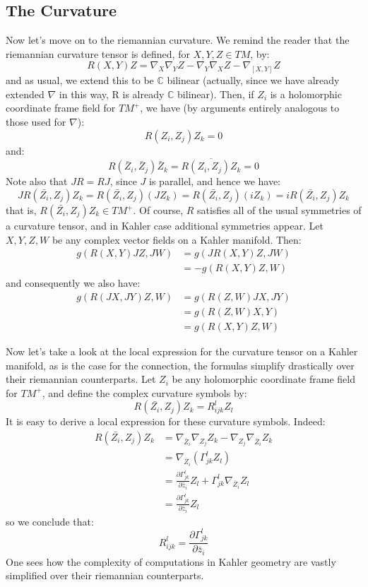 \documentclass[11pt]{amsart}
\theoremstyle{definition}
\def \C{ \mathbb{C} }
\def \del{ \partial }
\begin{document}
\subsection{The Curvature}

Now let's move on to the riemannian curvature.  We remind the reader that the riemannian curvature tensor is defined, for $X,Y,Z \in TM$, by:
%
$$ R(X,Y)Z = \nabla_{X} \nabla_{Y} Z - \nabla_{Y} \nabla_{X} Z - \nabla_{[X,Y]} Z $$
%
and as usual, we extend this to be $\C$ bilinear (actually, since we have already extended $\nabla$ in this way, R is already $\C$ bilinear).  Then, if $Z_i$ is a holomorphic coordinate frame field for $TM^{+}$, we have (by arguments entirely analogous to those used for $\nabla$):
%
$$ R(Z_i, Z_j) Z_k = 0 $$
%
and:
%
$$ R( \bar{Z}_i, \bar{Z}_j ) \bar{Z}_k = \overline{ R(Z_i, Z_j ) Z_k } = 0 $$
%
Note also that $JR = RJ$, since $J$ is parallel, and hence we have:
%
$$ J R( \bar{Z_i}, Z_j ) Z_k = R( \bar{Z_i}, Z_j )(J Z_k) = R( \bar{Z_i}, Z_j )( i Z_k) = i R( \bar{Z_i}, Z_j ) Z_k $$
%
that is, $ R( \bar{Z_i}, Z_j ) Z_k \in TM^{+} $.  Of course, $R$ satisfies all of the usual symmetries of a curvature tensor, and in Kahler case additional symmetries appear.  Let $X,Y,Z,W$ be any complex vector fields on a Kahler manifold.  Then:
%
\begin{align*}
g( R(X,Y) JZ, JW ) &=  g( J R(X,Y) Z, JW ) \\
&= - g( R(X,Y) Z, W )
\end{align*}
%
and consequently we also have:
%
\begin{align*}
g( R( JX, JY ) Z, W ) &= g( R(Z, W) JX, JY ) \\
&= g( R( Z, W ) X, Y ) \\
&= g( R(X, Y) Z, W )
\end{align*}

Now let's take a look at the local expression for the curvature tensor on a Kahler manifold, as is the case for the connection, the formulas simplify drastically over their riemannian counterparts.  Let $Z_i$ be any holomorphic coordinate frame field for $TM^{+}$, and define the complex curvature symbols by:
%
$$ R( \bar{Z_i}, Z_j ) Z_k = R_{ijk}^l Z_l $$
%
It is easy to derive a local expression for these curvature symbols.  Indeed:
%
\begin{align*}
R( \bar{Z_i}, Z_j ) Z_k &= \nabla_{ \bar{Z}_i } \nabla_{Z_j} Z_k - \nabla_{ Z_j } \nabla_{ \bar{Z}_i } Z_k \\
&= \nabla_{ \bar{Z}_i } \left( \Gamma_{jk}^l Z_l \right ) \\
&= \frac{ \del \Gamma_{jk}^l }{ \del \bar{z}_i } Z_l + \Gamma_{jk}^l \nabla_{ \bar{Z}_i } Z_l \\
&=  \frac{ \del \Gamma_{jk}^l }{ \del \bar{z}_i } Z_l
\end{align*}
%
so we conclude that:
%
$$ R_{ijk}^l = \frac{ \del \Gamma_{jk}^l }{ \del \bar{z}_i } $$
%
One sees how the complexity of computations in Kahler geometry are vastly simplified over their riemannian counterparts.
\end{document}
